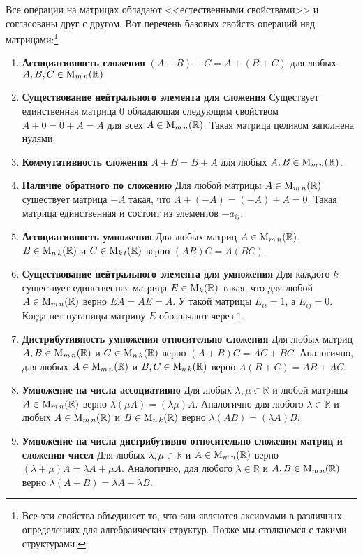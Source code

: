Все операции на матрицах обладают <<естественными свойствами>> и согласованы друг с другом. Вот перечень базовых свойств операций над матрицами:\footnote{Все эти свойства объединяет то, что они являются аксиомами в различных определениях для алгебраических структур. Позже мы столкнемся с такими структурами.}
\begin{enumerate}
\item {\bf Ассоциативность сложения} $(A + B) + C = A + (B + C)$ для любых $A,B,C\in \operatorname{M}_{m\,n}(\mathbb R)$
\item {\bf Существование нейтрального элемента для сложения} Существует единственная матрица $0$ обладающая следующим свойством $A + 0 = 0 + A = A$ для всех $A\in\operatorname{M}_{m\,n}(\mathbb R)$. Такая матрица целиком заполнена нулями.

\item {\bf Коммутативность сложения} $A + B = B + A$ для любых $A,B\in\operatorname{M}_{m\,n}(\mathbb R)$.

\item {\bf Наличие обратного по сложению} Для любой матрицы $A\in\operatorname{M}_{m\,n}(\mathbb R)$ существует матрица $-A$ такая, что $A + (-A) = (-A) + A = 0$. Такая матрица единственная и состоит из элементов $-a_{ij}$.

\item {\bf Ассоциативность умножения} Для любых матриц $A\in\operatorname{M}_{m\,n}(\mathbb R)$, $B\in\operatorname{M}_{n\,k}(\mathbb R)$ и $C\in\operatorname{M}_{k\,t}(\mathbb R)$ верно $(AB)C = A(BC)$.

\item {\bf Существование нейтрального элемента для умножения} Для каждого $k$ существует единственная матрица $E\in\operatorname{M}_{k}(\mathbb R)$ такая, что для любой $A\in\operatorname{M}_{m\,n}(\mathbb R)$ верно $E A = A E = A$. У такой матрицы $E_{ii} = 1$, а $E_{ij} = 0$. Когда нет путаницы матрицу $E$ обозначают через $1$.

\item {\bf Дистрибутивность умножения относительно сложения} Для любых матриц $A,B\in\operatorname{M}_{m\,n}(\mathbb R)$ и $C\in\operatorname{M}_{n\,k}(\mathbb R)$ верно $(A + B)C = AC + B C$. Аналогично, для любых $A\in\operatorname{M}_{m\,n}(\mathbb R)$ и $B,C\in\operatorname{M}_{n\,k}(\mathbb R)$ верно $A(B+C) = AB + AC$.

\item {\bf Умножение на числа ассоциативно} Для любых $\lambda,\mu \in\mathbb R$ и любой матрицы $A\in\operatorname{M}_{m\,n}(\mathbb R)$ верно $\lambda(\mu A) = (\lambda \mu) A$. Аналогично для любого $\lambda \in \mathbb R$ и любых $A\in\operatorname{M}_{m\,n}(\mathbb R)$ и $B\in \operatorname{M}_{n\,k}(\mathbb R)$ верно $\lambda(AB) = (\lambda A) B$.

\item {\bf Умножение на числа дистрибутивно относительно сложения матриц и сложения чисел} Для любых $\lambda,\mu\in \mathbb R$ и $A\in \operatorname{M}_{m\,n}(\mathbb R)$ верно $(\lambda + \mu)A = \lambda A +\mu A$. Аналогично, для любого $\lambda\in\mathbb R$ и $A,B\in\operatorname{M}_{m\,n}(\mathbb R)$ верно $\lambda(A+B) = \lambda A + \lambda B$.


\end{enumerate}
